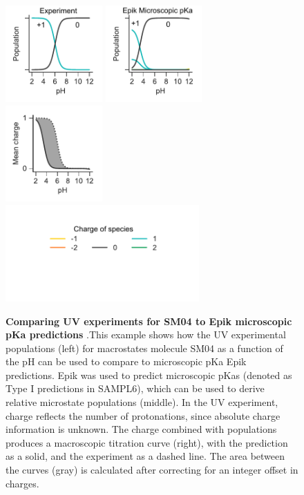 \documentclass[9pt,lineno,final]{elife}
\begin{document}
\begin{figure}[H]
{	\label{fig:jaguar-prediction}}
\end{figure}


\begin{figure}[H]
	\centering
	\includegraphics[width=0.33\textwidth]{Reports/Experiment-populations-SM04-titled.pdf}
	\includegraphics[width=0.33\textwidth]{Reports/Epik-TypeI-populations-SM04-titled.pdf}
	\includegraphics[width=0.33\textwidth]{Reports/Epik-TypeI-virtual-titration-SM04.pdf}\\
	\includegraphics[width=0.66\textwidth, trim={0 2cm 0 1cm},clip]{Reports/overview-charge-legend-2.pdf}
		\caption{{\bf Comparing UV experiments for SM04 to Epik microscopic pKa predictions} .This example shows how the UV experimental populations (left) for macrostates molecule SM04 as a function of the pH can be used to compare to microscopic pKa Epik predictions. Epik was used to predict microscopic pKas (denoted as Type I predictions in SAMPL6), which can be used to derive relative microstate populations (middle). In the UV experiment, charge reflects the number of protonations, since absolute charge information is unknown. The charge combined with populations produces a macroscopic titration curve (right), with the prediction as a solid, and the experiment as a dashed line. The area between the curves (gray) is calculated after correcting for an integer offset in charges.  
}
\end{figure}
\end{document}
